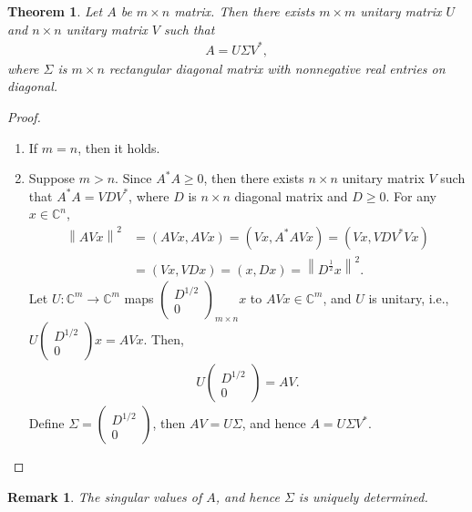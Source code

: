 \documentclass[10pt]{book}
\newtheorem{theorem}{Theorem}[chapter]
\newtheorem{remark}{Remark}[chapter]
\theoremstyle{definition}
\numberwithin{equation}{chapter}
\begin{document}
\begin{theorem}
Let $A$ be $m\times n$ matrix. Then there exists $m \times m$ unitary matrix $U$ and $n \times n$ unitary matrix $V$ such that
\begin{align*}
    A = U \Sigma V^*,
\end{align*}
where $\Sigma$ is $m \times n$ rectangular diagonal matrix with nonnegative real entries on diagonal.
\end{theorem}
\begin{proof}
~\begin{enumerate}[label=(\alph*)]
    \item If $m = n$, then it holds.
    
    \item Suppose $m > n$. Since $A^*A \geq 0$, then there exists $n \times n$ unitary matrix $V$ such that $A^*A = V D V^*$, where $D$ is $n \times n$ diagonal matrix and $D \geq 0$. For any $x \in \mathbb{C}^n$, 
    \begin{align*}
        \left\|AV x\right\|^2 & = (AVx, AVx) = (Vx, A^*AV x) = (Vx, V D V^* V x) \\
        & = (Vx, VDx) = (x, Dx) = \left\|D^{\frac{1}{2}} x\right\|^2.
    \end{align*}
    Let $U: \mathbb{C}^m \to \mathbb{C}^m$ maps $\begin{pmatrix}
        D^{1/2} \\
        0
    \end{pmatrix}_{m\times n}x$ to $AVx \in \mathbb{C}^m$, and $U$ is unitary, i.e., $U \begin{pmatrix} D^{1/2} \\ 0 \end{pmatrix}x = AVx$. Then, 
    \begin{align*}
        U \begin{pmatrix} D^{1/2} \\ 0 \end{pmatrix} = AV.
    \end{align*}
    Define $\Sigma = \begin{pmatrix} D^{1/2} \\ 0 \end{pmatrix}$, then $AV = U\Sigma$, and hence $A = U\Sigma V^*$.
\end{enumerate}
\end{proof}

\begin{remark}
The singular values of $A$, and hence $\Sigma$ is uniquely determined. 
\end{remark}
\end{document}
